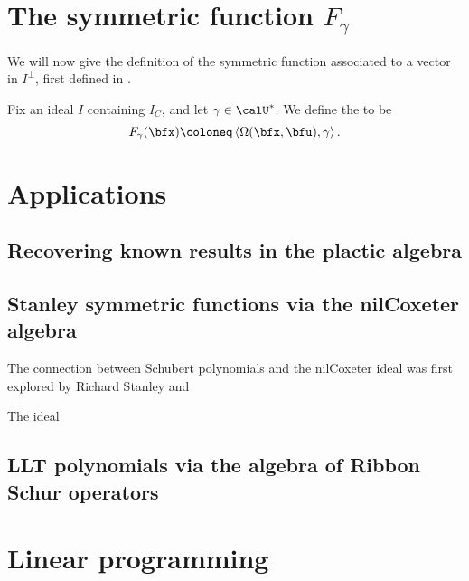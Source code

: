 \documentclass{article}
\newcommand{\ip}[1]{
    \left\langle
        {#1}
    \right\rangle
}
\begin{document}
\section{
    The symmetric function $F_\gamma$
}

We will now give the definition of the symmetric function associated to a vector in $I^\perp$, first defined in \cite{FG98}.

\begin{definition}
    Fix an ideal $I$ containing $I_C$, and let $\gamma \in \calU^\ast$.
    We define the  to be
    \[
        F_\gamma(\bfx)
        \coloneq
        \ip{\Omega(\bfx,\bfu),\gamma}.
    \]
\end{definition}

\begin{definition}
\end{definition}

\section{Applications}

\subsection{Recovering known results in the plactic algebra}

\begin{theorem}
\end{theorem}

\subsection{Stanley symmetric functions via the nilCoxeter algebra}

The connection between Schubert polynomials and the nilCoxeter ideal was first explored by Richard Stanley and 

\begin{definition}
    The  ideal
\end{definition}

\subsection{LLT polynomials via the algebra of Ribbon Schur operators}

\section{Linear programming}
\end{document}
